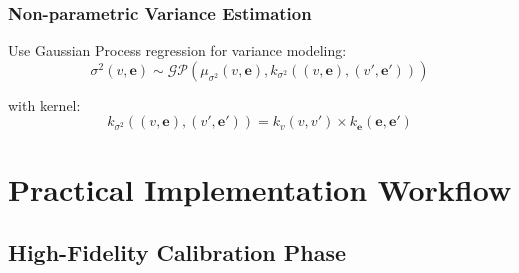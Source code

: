 \documentclass[11pt]{article}
\begin{document}
\subsubsection{Non-parametric Variance Estimation}
Use Gaussian Process regression for variance modeling:
\begin{equation}
\sigma^2(v, \mathbf{e}) \sim \mathcal{GP}(\mu_{\sigma^2}(v, \mathbf{e}), k_{\sigma^2}((v, \mathbf{e}), (v', \mathbf{e}')))
\end{equation}

with kernel:
\begin{equation}
k_{\sigma^2}((v, \mathbf{e}), (v', \mathbf{e}')) = k_v(v, v') \times k_{\mathbf{e}}(\mathbf{e}, \mathbf{e}')
\end{equation}

\section{Practical Implementation Workflow}

\subsection{High-Fidelity Calibration Phase}
\end{document}
